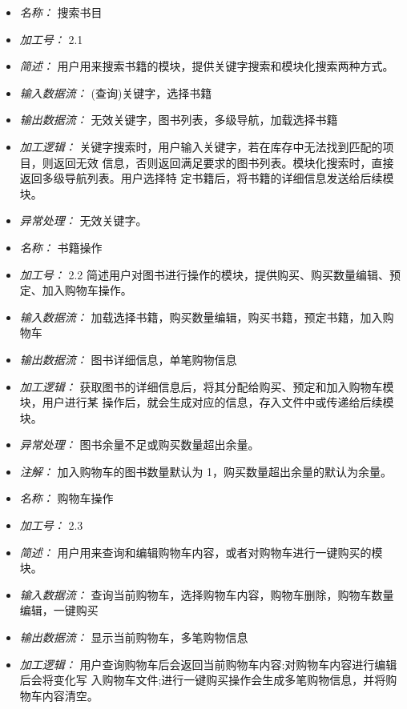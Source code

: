 \begin{itemize}
\item \textit{名称： }搜索书目
\item \textit{加工号： }2.1
\item \textit{简述： }用户用来搜索书籍的模块，提供关键字搜索和模块化搜索两种方式。 
\item \textit{输入数据流： }(查询)关键字，选择书籍 
\item \textit{输出数据流： }无效关键字，图书列表，多级导航，加载选择书籍 
\item \textit{加工逻辑： }关键字搜索时，用户输入关键字，若在库存中无法找到匹配的项目，则返回无效 信息，否则返回满足要求的图书列表。模块化搜索时，直接返回多级导航列表。用户选择特 定书籍后，将书籍的详细信息发送给后续模块。
\item \textit{异常处理： }无效关键字。

\end{itemize}


\vspace{-1mm}


\begin{itemize}
\item \textit{名称： } 书籍操作
\item \textit{加工号： }2.2 简述用户对图书进行操作的模块，提供购买、购买数量编辑、预定、加入购物车操作。 
\item \textit{输入数据流： }加载选择书籍，购买数量编辑，购买书籍，预定书籍，加入购物车 
\item \textit{输出数据流： }图书详细信息，单笔购物信息 
\item \textit{加工逻辑： }获取图书的详细信息后，将其分配给购买、预定和加入购物车模块，用户进行某 操作后，就会生成对应的信息，存入文件中或传递给后续模块。 
\item \textit{异常处理： }图书余量不足或购买数量超出余量。
\item \textit{注解： }加入购物车的图书数量默认为 1，购买数量超出余量的默认为余量。

\end{itemize}


\vspace{-1mm}


\begin{itemize}
\item \textit{名称： } 购物车操作
\item \textit{加工号： }2.3 
\item \textit{简述： }用户用来查询和编辑购物车内容，或者对购物车进行一键购买的模块。 
\item \textit{输入数据流： }查询当前购物车，选择购物车内容，购物车删除，购物车数量编辑，一键购买 
\item \textit{输出数据流： }显示当前购物车，多笔购物信息 
\item \textit{加工逻辑： }用户查询购物车后会返回当前购物车内容;对购物车内容进行编辑后会将变化写 入购物车文件;进行一键购买操作会生成多笔购物信息，并将购物车内容清空。

\end{itemize}


